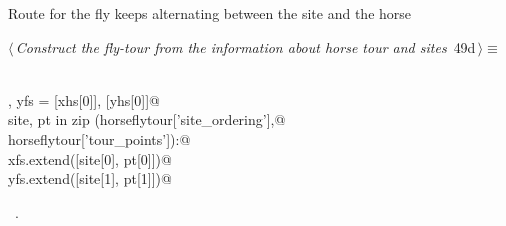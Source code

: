 \documentclass[11.5pt]{report}
\begin{document}
\vspace{-0.8cm} \newchunk Route for the fly  keeps alternating between the site and the horse
\begin{flushleft} \small
\begin{minipage}{\linewidth}\label{scrap76}\raggedright\small
{} $\langle\,${\itshape Construct the fly-tour from the information about horse tour and sites}\nobreak\ {\footnotesize {49d}}$\,\rangle\equiv$
\vspace{-1ex}
\begin{list}{}{} \item
\mbox{}\verb@@\\
\mbox{}\verb@xfs , yfs = [xhs[0]], [yhs[0]]@\\
\mbox{}\verb@for site, pt in zip (horseflytour['site_ordering'],@\\
\mbox{}\verb@                     horseflytour['tour_points']):@\\
\mbox{}\verb@   xfs.extend([site[0], pt[0]])@\\
\mbox{}\verb@   yfs.extend([site[1], pt[1]])@\\
\mbox{}\verb@@{\NWsep}
\end{list}
\vspace{-1.5ex}
\footnotesize
\begin{list}{}{\setlength{\itemsep}{-\parsep}\setlength{\itemindent}{-\leftmargin}}
\item \NWtxtMacroRefIn\ .

\item{}
\end{list}
\end{minipage}\vspace{4ex}
\end{flushleft}
\end{document}
